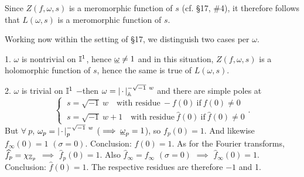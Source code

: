 \vspace{0.1cm}

Since $Z(f,\omega,s)$ is a meromorphic function of $s$ (cf. \S17, \#4), it therefore follows that $L(\omega,s)$ is a meromorphic function of $s$.

\vspace{0.1cm}

Working now within the setting of \S17, we distinguish two cases per $\omega$.

\vspace{0.1cm}

1. \quad $\omega$ is nontrivial on $\mathbb{I}^1$, hence $\underline{\omega} \neq 1$ and in this situation,  
$Z(f,\omega,s)$ is a holomorphic function of $s$, hence the same is true of $L(\omega,s)$.

\vspace{0.1cm}

2. \quad $\omega$ is trivial on $\mathbb{I}^1$ $-$then $\omega = \left\vert\hspace{0.05cm} \cdot \hspace{0.05cm}\right\vert_{\mathbb{A}}^{-\sqrt{-1} \ w}$ 
and there are simple poles at 
\[
\begin{cases}
\ s = \sqrt{-1} \  w \quad \text{with residue} \  -f(0) \ \text{if} \ f(0) \neq 0\\
\ s = \sqrt{-1} \  w + 1 \quad \text{with residue} \  \widehat{f}(0) \ \text{if} \ \widehat{f}(0) \neq 0
\end{cases}
.
\]
But $\forall \ p$, $\omega_p = \left\vert\hspace{0.05cm} \cdot \hspace{0.05cm}\right\vert_p^{-\sqrt{-1} \ w}$ ($\implies \underline{\omega}_p = 1$), so 
$f_p(0) = 1$.  
And likewise $f_\infty(0) = 1$ $(\sigma = 0)$.    
Conclusion: $f(0) = 1$.  
As for the Fourier transforms, $\widehat{f}_p = \chi_{\mathbb{Z}_p}$ $\implies$ $\widehat{f}_p(0) = 1$.  
Also $\widehat{f}_\infty = f_\infty$ $(\sigma = 0)$ $\implies$ $\widehat{f}_\infty(0) = 1$.  
Conclusion: $\widehat{f}(0) = 1$.  
The respective residues are therefore $-1$ and 1.
\vspace{0.2cm}


